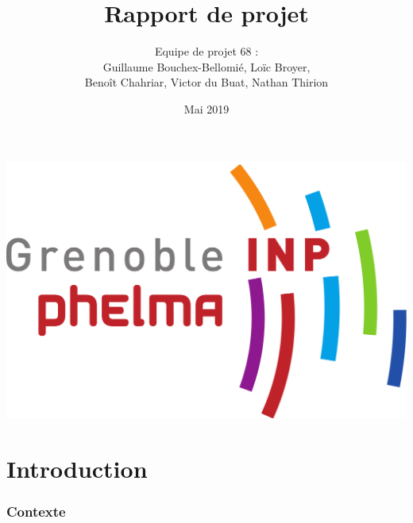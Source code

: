 \documentclass{article}
\title{{\Huge Rapport de projet}}
\author{{\huge Equipe de projet 68 :} \\ {\LARGE Guillaume Bouchex-Bellomié, Loïc Broyer, } \\ \LARGE{Benoît Chahriar, Victor du Buat, Nathan Thirion}}
\date{{\large Mai 2019}}
\begin{document}
\begin{flushleft}
 \includegraphics[scale = 0.15]{logoPhelma}
\end{flushleft}
{\let\newpage\relax\maketitle}

\newpage
\null
\newpage

\renewcommand{\contentsname}{\Huge{Sommaire}}
\tableofcontents
\newpage


\part{Introduction}
\section{Contexte}
\end{document}
